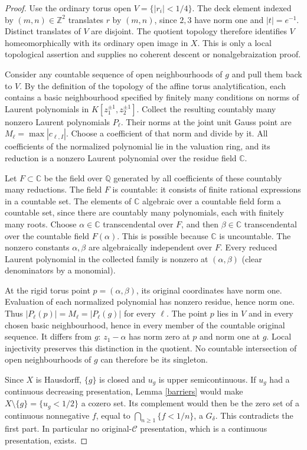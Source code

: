 \documentclass[11pt]{article}
\newcommand{\C}{\mathcal C}
\begin{document}
\begin{proof}
Use the ordinary torus open $V=\{|r_i|<1/4\}$. The deck element indexed
by $(m,n)\in\mathbb Z^2$ translates $r$ by $(m,n)$, since $2,3$ have
norm one and $|t|=e^{-1}$. Distinct translates of $V$ are disjoint.
The quotient topology therefore identifies $V$ homeomorphically with
its ordinary open image in $X$. This is only a local topological
assertion and supplies no coherent descent or nonalgebraization proof.

Consider any countable sequence of open neighbourhoods of $g$ and pull
them back to $V$. By the definition of the topology of the affine torus
analytification, each contains a basic neighbourhood specified by finitely
many conditions on norms of Laurent polynomials in
$K[z_1^{\pm1},z_2^{\pm1}]$. Collect the resulting countably many nonzero
Laurent polynomials $P_\ell$. Their norms at the joint unit Gauss point
are $M_\ell=\max|c_{\ell,I}|$. Choose a coefficient of that norm and
divide by it. All coefficients of the normalized polynomial lie in the
valuation ring, and its reduction is a nonzero Laurent polynomial over
the residue field $\mathbb C$.

Let $F\subset\mathbb C$ be the field over $\mathbb Q$ generated by all
coefficients of these countably many reductions. The field $F$ is
countable: it consists of finite rational expressions in a countable
set. The elements of $\mathbb C$ algebraic over a countable field form
a countable set, since there are countably many polynomials, each with
finitely many roots. Choose $\alpha\in\mathbb C$ transcendental over
$F$, and then $\beta\in\mathbb C$ transcendental over the countable
field $F(\alpha)$. This is possible because $\mathbb C$ is uncountable.
The nonzero constants $\alpha,\beta$ are algebraically independent over
$F$. Every reduced Laurent polynomial in the collected family is
nonzero at $(\alpha,\beta)$ (clear denominators by a monomial).

At the rigid torus point $p=(\alpha,\beta)$, its original coordinates
have norm one. Evaluation of each normalized polynomial has nonzero
residue, hence norm one. Thus $|P_\ell(p)|=M_\ell=|P_\ell(g)|$ for
every $\ell$. The point $p$ lies in $V$ and in every chosen basic
neighbourhood, hence in every member of the countable original sequence.
It differs from $g$: $z_1-\alpha$ has norm zero at $p$ and norm one at
$g$. Local injectivity preserves this distinction in the quotient.
No countable intersection of open neighbourhoods of $g$ can therefore
be its singleton.

Since $X$ is Hausdorff, $\{g\}$ is closed and $u_g$ is upper
semicontinuous. If $u_g$ had a continuous decreasing presentation,
Lemma \ref{barriers} would make $X\setminus\{g\}=\{u_g<1/2\}$ a
cozero set. Its complement would then be the zero set of a continuous
nonnegative $f$, equal to $\bigcap_{n\ge1}\{f<1/n\}$, a $G_\delta$.
This contradicts the first part. In particular no original-$\C$
presentation, which is a continuous presentation, exists.
\end{proof}
\end{document}
